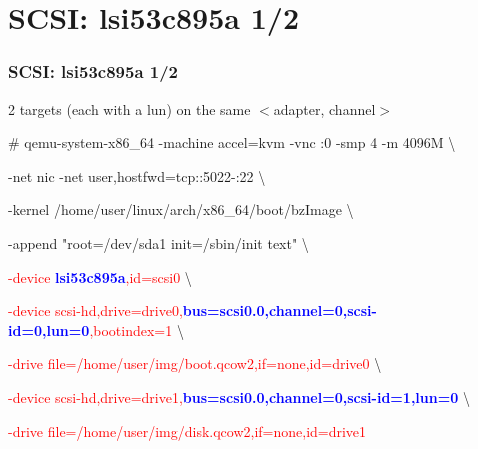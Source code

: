 \documentclass[aspectratio=169]{beamer}
\begin{document}
\section{SCSI: lsi53c895a 1/2}
\begin{frame}
\frametitle{SCSI: lsi53c895a 1/2}
{\LARGE 2 targets (each with a lun) on the same $<$adapter, channel$>$}
\\
\begin{block}{}

\# qemu-system-x86\_64 -machine accel=kvm -vnc :0 -smp 4 -m 4096M \textbackslash

-net nic -net user,hostfwd=tcp::5022-:22 \textbackslash

-kernel /home/user/linux/arch/x86\_64/boot/bzImage \textbackslash
	
-append "root=/dev/sda1 init=/sbin/init text" \textbackslash

\textcolor{red}{-device \textbf{\textcolor{blue}{lsi53c895a}},id=scsi0} \textbackslash
	
\textcolor{red}{-device scsi-hd,drive=drive0,\textbf{\textcolor{blue}{bus=scsi0.0,channel=0,scsi-id=0,lun=0}},bootindex=1} \textbackslash

\textcolor{red}{-drive file=/home/user/img/boot.qcow2,if=none,id=drive0} \textbackslash

\textcolor{red}{-device scsi-hd,drive=drive1,\textbf{\textcolor{blue}{bus=scsi0.0,channel=0,scsi-id=1,lun=0}}} \textbackslash

\textcolor{red}{-drive file=/home/user/img/disk.qcow2,if=none,id=drive1}
\end{block}
\end{frame}

\end{document}
